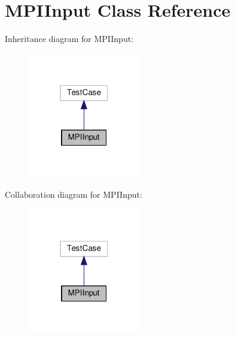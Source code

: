 \hypertarget{classMPIInput}{}\section{M\+P\+I\+Input Class Reference}
\label{classMPIInput}


Inheritance diagram for M\+P\+I\+Input\+:\nopagebreak
\begin{figure}[H]
\begin{center}
\leavevmode
\includegraphics[width=139pt]{classMPIInput__inherit__graph}
\end{center}
\end{figure}


Collaboration diagram for M\+P\+I\+Input\+:\nopagebreak
\begin{figure}[H]
\begin{center}
\leavevmode
\includegraphics[width=139pt]{classMPIInput__coll__graph}
\end{center}
\end{figure}
